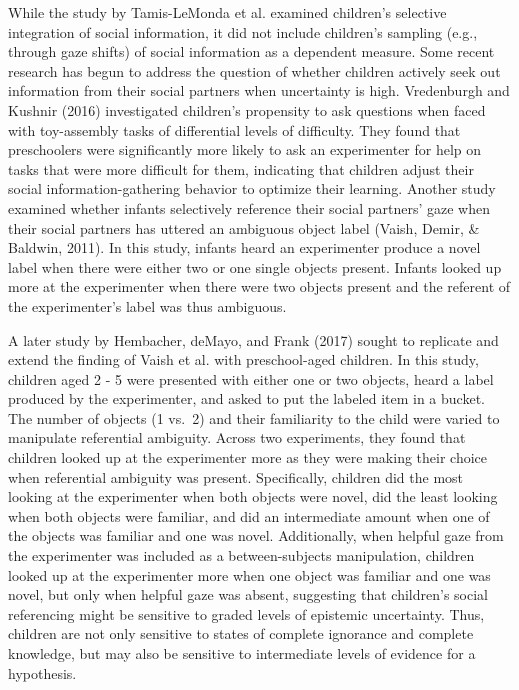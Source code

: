 \documentclass[floatsintext,man]{apa6}
\theoremstyle{definition}
\theoremstyle{definition}
\theoremstyle{definition}
\theoremstyle{remark}
\begin{document}
While the study by Tamis-LeMonda et al. examined children's selective
integration of social information, it did not include children's
sampling (e.g., through gaze shifts) of social information as a
dependent measure. Some recent research has begun to address the
question of whether children actively seek out information from their
social partners when uncertainty is high. Vredenburgh and Kushnir (2016)
investigated children's propensity to ask questions when faced with
toy-assembly tasks of differential levels of difficulty. They found that
preschoolers were significantly more likely to ask an experimenter for
help on tasks that were more difficult for them, indicating that
children adjust their social information-gathering behavior to optimize
their learning. Another study examined whether infants selectively
reference their social partners' gaze when their social partners has
uttered an ambiguous object label (Vaish, Demir, \& Baldwin, 2011). In
this study, infants heard an experimenter produce a novel label when
there were either two or one single objects present. Infants looked up
more at the experimenter when there were two objects present and the
referent of the experimenter's label was thus ambiguous.

A later study by Hembacher, deMayo, and Frank (2017) sought to replicate
and extend the finding of Vaish et al. with preschool-aged children. In
this study, children aged 2 - 5 were presented with either one or two
objects, heard a label produced by the experimenter, and asked to put
the labeled item in a bucket. The number of objects (1 vs.~2) and their
familiarity to the child were varied to manipulate referential
ambiguity. Across two experiments, they found that children looked up at
the experimenter more as they were making their choice when referential
ambiguity was present. Specifically, children did the most looking at
the experimenter when both objects were novel, did the least looking
when both objects were familiar, and did an intermediate amount when one
of the objects was familiar and one was novel. Additionally, when
helpful gaze from the experimenter was included as a between-subjects
manipulation, children looked up at the experimenter more when one
object was familiar and one was novel, but only when helpful gaze was
absent, suggesting that children's social referencing might be sensitive
to graded levels of epistemic uncertainty. Thus, children are not only
sensitive to states of complete ignorance and complete knowledge, but
may also be sensitive to intermediate levels of evidence for a
hypothesis.
\end{document}
